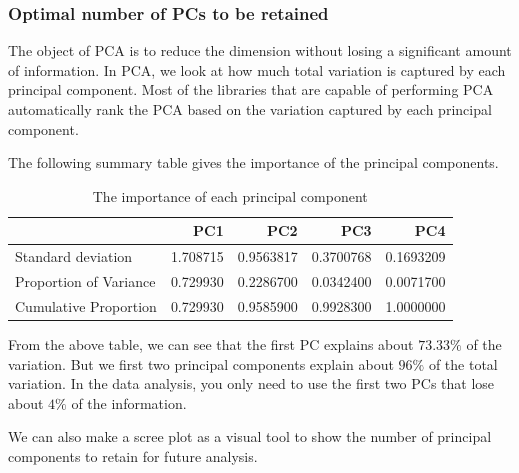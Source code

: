 \documentclass[
]{book}
\newenvironment{Shaded}{\begin{snugshade}}{\end{snugshade}}
\newcommand{\AttributeTok}[1]{\textcolor[rgb]{0.13,0.29,0.53}{#1}}
\newcommand{\FunctionTok}[1]{\textcolor[rgb]{0.13,0.29,0.53}{\textbf{#1}}}
\newcommand{\NormalTok}[1]{#1}
\newcommand{\SpecialCharTok}[1]{\textcolor[rgb]{0.81,0.36,0.00}{\textbf{#1}}}
\newcommand{\StringTok}[1]{\textcolor[rgb]{0.31,0.60,0.02}{#1}}
\begin{document}
\hypertarget{optimal-number-of-pcs-to-be-retained}{%
\subsubsection{Optimal number of PCs to be retained}\label{optimal-number-of-pcs-to-be-retained}}

The object of PCA is to reduce the dimension without losing a significant amount of information. In PCA, we look at how much total variation is captured by each principal component. Most of the libraries that are capable of performing PCA automatically rank the PCA based on the variation captured by each principal component.

The following summary table gives the importance of the principal components.

\begin{Shaded}
\end{Shaded}

\begin{table}

\caption{\label{tab:unnamed-chunk-215}The importance of each principal component}
\centering
\begin{tabular}[t]{l|r|r|r|r}
\hline
  & PC1 & PC2 & PC3 & PC4\\
\hline
Standard deviation & 1.708715 & 0.9563817 & 0.3700768 & 0.1693209\\
\hline
Proportion of Variance & 0.729930 & 0.2286700 & 0.0342400 & 0.0071700\\
\hline
Cumulative Proportion & 0.729930 & 0.9585900 & 0.9928300 & 1.0000000\\
\hline
\end{tabular}
\end{table}

From the above table, we can see that the first PC explains about \(73.33\%\) of the variation. But we first two principal components explain about \(96\%\) of the total variation. In the data analysis, you only need to use the first two PCs that lose about \(4\%\) of the information.

We can also make a scree plot as a visual tool to show the number of principal components to retain for future analysis.
\end{document}
